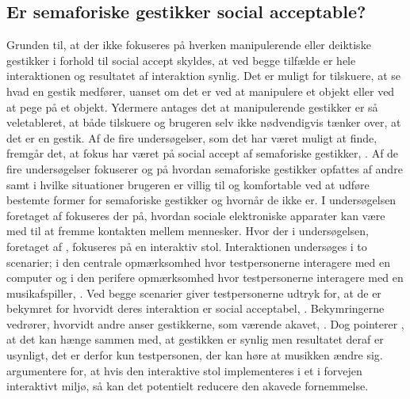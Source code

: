 \subsection{Er semaforiske gestikker social acceptable?}
\label{Socialaccept}
%            
Grunden til, at der ikke fokuseres på hverken manipulerende eller deiktiske gestikker i forhold til social accept skyldes, at ved begge tilfælde er hele interaktionen og resultatet af interaktion synlig. Det er muligt for tilskuere, at se hvad en gestik medfører, uanset om det er ved at manipulere et objekt eller ved at pege på et objekt. Ydermere antages det at manipulerende gestikker er så veletableret, at både tilskuere og brugeren selv ikke nødvendigvis tænker over, at det er en gestik. \blankline
%
Af de fire undersøgelser, som det har været muligt at finde, fremgår det, at fokus har været på social accept af semaforiske gestikker, \parencite{PDF:AChairAsUbiquitousInputDevice, PDF:WouldYouDoThat, PDF:AreYouComfortableDoingThat, PDF:AnExploratoryStudy}. Af de fire undersøgelser fokuserer \textcite{PDF:AreYouComfortableDoingThat} og \textcite{PDF:WouldYouDoThat} på hvordan semaforiske gestikker opfattes af andre samt i hvilke situationer brugeren er villig til og komfortable ved at udføre bestemte former for semaforiske gestikker og hvornår de ikke er. I undersøgelsen foretaget af \textcite{PDF:AnExploratoryStudy} fokuseres der på, hvordan sociale elektroniske apparater kan være med til at fremme kontakten mellem mennesker. Hvor der i undersøgelsen, foretaget af \textcite{PDF:AChairAsUbiquitousInputDevice}, fokuseres på en interaktiv stol. Interaktionen undersøges i to scenarier; i den centrale opmærksomhed hvor testpersonerne interagere med en computer og i den perifere opmærksomhed hvor testpersonerne interagere med en musikafspiller, \parencite{PDF:AChairAsUbiquitousInputDevice}. Ved begge scenarier giver testpersonerne udtryk for, at de er bekymret for hvorvidt deres interaktion er social acceptabel, \parencite[s. 8]{PDF:AChairAsUbiquitousInputDevice}. Bekymringerne vedrører, hvorvidt andre anser gestikkerne, som værende akavet, \parencite[s. 4]{PDF:AChairAsUbiquitousInputDevice}. Dog pointerer \textcite[s. 9]{PDF:AChairAsUbiquitousInputDevice}, at det kan hænge sammen med, at gestikken er synlig men resultatet deraf er usynligt, det er derfor kun testpersonen, der kan høre at musikken ændre sig. \textcite[s. 9]{PDF:AChairAsUbiquitousInputDevice} argumentere for, at hvis den interaktive stol implementeres i et i forvejen interaktivt miljø, så kan det potentielt reducere den akavede fornemmelse.\blankline

